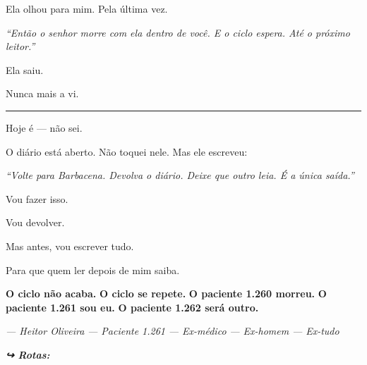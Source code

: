 \noindent Ela olhou para mim. Pela última vez.

\noindent \textit{\textquotedblleft{}Então o senhor morre com ela dentro de você. E o ciclo espera. Até o próximo leitor.\textquotedblright{}}

\noindent Ela saiu.

\noindent Nunca mais a vi.

\vspace{0.5em}\noindent\rule{\textwidth}{0.5pt}\vspace{0.5em}

\noindent Hoje é --- não sei.

\noindent O diário está aberto. Não toquei nele. Mas ele escreveu:

\noindent \textit{\textquotedblleft{}Volte para Barbacena. Devolva o diário. Deixe que outro leia. É a única saída.\textquotedblright{}}

\noindent Vou fazer isso.

\noindent Vou devolver.

\noindent Mas antes, vou escrever tudo.

\noindent Para que quem ler depois de mim saiba.

\noindent \textbf{O ciclo não acaba.}
\textbf{O ciclo se repete.}
\textbf{O paciente 1.260 morreu.}
\textbf{O paciente 1.261 sou eu.}
\textbf{O paciente 1.262 será outro.}

\noindent \textit{--- Heitor Oliveira}
\textit{--- Paciente 1.261}
\textit{--- Ex-médico}
\textit{--- Ex-homem}
\textit{--- Ex-tudo}

\vspace{0.5em}
\noindent\textit{\textbf{↪ Rotas:}  \rotasep {} \rotasep {}}